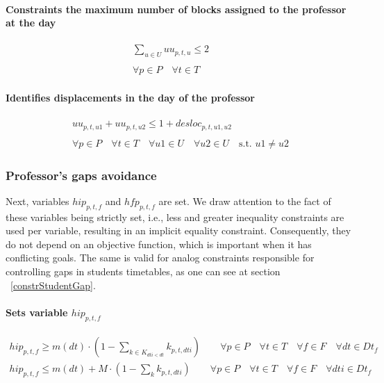 \paragraph{Constraints the maximum number of blocks assigned to the professor at the day}
\begin{eqnarray}
\sum\limits_{u \in U} uu_{p,t,u} \le 2 \nonumber \qquad
\\
\\
\forall p \in P \quad
\forall t \in T \quad
\end{eqnarray}

\paragraph{Identifies displacements in the day of the professor}
\begin{eqnarray}
uu_{p,t,u1} + uu_{p,t,u2} \le 1 + desloc_{p,t,u1,u2} \nonumber \qquad
\\
\\
\forall p \in P \quad
\forall t \in T \quad
\forall u1 \in U \quad
\forall u2 \in U \quad \mbox{s.t. }u1 \neq u2
\end{eqnarray}


\subsubsection{Professor's gaps avoidance}
\label{constrProfessorGap}

Next, variables $hip_{p,t,f}$ and $hfp_{p,t,f}$ are set. We draw attention to the fact of these variables being strictly set, i.e., less and greater inequality constraints are used per variable, resulting in an implicit equality constraint. Consequently, they do not depend on an objective function, which is important when it has conflicting goals. The same is valid for analog constraints responsible for controlling gaps in students timetables, as one can see at section ~\ref{constrStudentGap}.  

\paragraph{Sets variable $hip_{p,t,f}$}
\begin{eqnarray}
hip_{p,t,f} \geq m(dt) \cdot ( 1 - \sum\limits_{k \in K_{dti<dt}} k_{p,t,dti} ) \nonumber \qquad
\forall p \in P \quad
\forall t \in T \quad
\forall f \in F \quad
\forall dt \in Dt_{f}
\end{eqnarray}
\begin{eqnarray}
hip_{p,t,f} \leq m(dt) + M \cdot ( 1 - \sum\limits_{k} k_{p,t,dti} ) \nonumber \qquad
\forall p \in P \quad
\forall t \in T \quad
\forall f \in F \quad
\forall dti \in Dt_{f}
\end{eqnarray}

